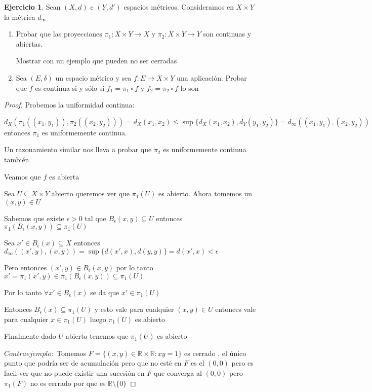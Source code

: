 \documentclass[12pt]{article}
\newcommand{\R}{\mathbb{R}}
\newcommand{\ra}{\rightarrow}
\theoremstyle{definition}
\newtheorem{ej}{Ejercicio}
\begin{document}
 \begin{ej}
   Sean $(X,d)$ e $(Y,d') $ espacios métricos. Consideramos en $X \times Y$ la métrica $d_{\infty}$
   \begin{enumerate}
     \item Probar que las proyecciones $\pi_1 : X \times Y \ra X$ y $\pi_2 : X \times Y \ra Y$ son continuas y abiertas.

       Mostrar con un ejemplo que pueden no ser cerradas

     \item Sea $(E,\delta)$ un espacio métrico y sea $f: E \ra X \times Y $ una aplicación. Probar que $f$ es continua si y sólo si $f_1 = \pi_1 \circ f$ y $f_2 = \pi_2 \circ f$ lo son
   \end{enumerate}
   \begin{proof}
Probemos la uniformidad continua:

    $d_X(\pi_1((x_1,y_1)),\pi_2( (x_2,y_2))) = d_X(x_1,x_2) \leq \sup\{d_X(x_1,x_2), d_Y(y_1,y_2)\} = d_{\infty}( (x_1,y_1),(x_2,y_2))$ entonces $\pi_1$ es uniformemente continua.

     Un razonamiento similar nos lleva a probar que $\pi_2$ es uniformemente continua también

     Veamos que $f$ es abierta

     Sea $U \subseteq X\times Y$ abierto queremos ver que $\pi_1(U)$ es abierto. Ahora tomemos un $(x,y) \in U$ 

     Sabemos que existe $\epsilon >0 $ tal que $B_{\epsilon}(x,y) \subseteq U$ entonces $\pi_1 (B_{\epsilon}(x,y)) \subseteq \pi_1(U)$

     Sea $x' \in B_{\epsilon}(x) \subseteq X$ entonces $d_{\infty}((x',y),(x,y)) = \sup\{d(x',x), d(y,y)\} = d(x',x)< \epsilon$ 

 Pero entonces $(x',y) \in B_{\epsilon}(x,y)$ por lo tanto $x' = \pi_1 (x',y) \in \pi_1(B_{\epsilon}(x,y)) \subseteq \pi_1 (U)$

 Por lo tanto $\forall x' \in B_{\epsilon}(x)$ se da que $x' \in \pi_1(U)$

 Entonces $B_{\epsilon}(x) \subseteq \pi_1(U)$ y esto vale para cualquier $(x,y) \in U$ entonces vale para cualquier  $ x \in \pi_1(U) $ luego $\pi_1(U)$ es abierto

 Finalmente dado $U$ abierto tenemos que $\pi_1(U)$ es abierto

 $Contraejemplo:$
 Tomemos $F = \{(x,y) \in \R \times \R : xy = 1\}$ es cerrado , el único punto que podría ser de acumulación pero que no esté en $F$ es el $(0,0)$ pero es facil ver que no puede existir una sucesión en $F$ que converga al $(0,0)$ pero $\pi_1 (F)$ no es cerrado por que es $\R \setminus \{0\}$


\end{proof}
\end{ej}
\end{document}
